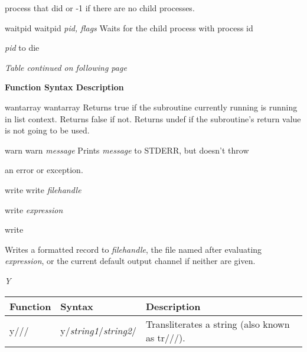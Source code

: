 \documentclass[a4paper,11pt]{book}
\begin{document}
\noindent process that did or -1 if there are no child processes.

\noindent 

\noindent 

\noindent 

\noindent waitpid waitpid \textit{pid, flags }Waits for the child process with process id

\noindent \textit{pid }to die

\noindent 

\noindent 

\noindent \textit{Table continued on following page}

\noindent 

\noindent 

\noindent \textbf{Function Syntax Description}

\noindent 

\noindent wantarray wantarray Returns true if the subroutine currently running is running in list context. Returns false if not. Returns undef if the subroutine's return value is not going to be used.

\noindent 

\noindent 

\noindent warn warn \textit{message }Prints \textit{message }to STDERR, but doesn't throw

\noindent an error or exception.

\noindent 

\noindent 

\noindent write write \textit{filehandle}

\noindent 

\noindent write \textit{expression}

\noindent 

\noindent write

\noindent Writes a formatted record to \textit{filehandle}, the file named after evaluating \textit{expression}, or the current default output channel if neither are given.

\noindent 

\noindent 

\noindent \textit{Y}

\begin{tabular}{|p{0.8in}|p{1.1in}|p{2.1in}|} \hline 
\textbf{Function} & \textbf{Syntax} & \textbf{Description} \\ \hline 
y/// & y/\textit{string1}/\textit{string2}/ & Transliterates a string (also known as tr///). \\ \hline 
\end{tabular}
\end{document}
